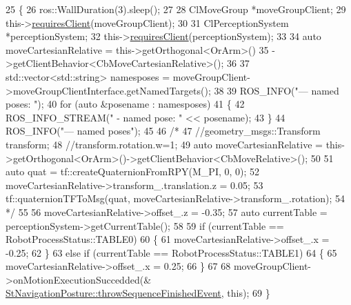 \begin{DoxyCode}
25     \{
26         ros::WallDuration(3).sleep();
27 
28         ClMoveGroup *moveGroupClient;
29         this->\hyperlink{classsmacc_1_1ISmaccState_a7f95c9f0a6ea2d6f18d1aec0519de4ac}{requiresClient}(moveGroupClient);
30 
31         ClPerceptionSystem *perceptionSystem;
32         this->\hyperlink{classsmacc_1_1ISmaccState_a7f95c9f0a6ea2d6f18d1aec0519de4ac}{requiresClient}(perceptionSystem);
33 
34         \textcolor{keyword}{auto} moveCartesianRelative = this->getOrthogonal<OrArm>()
35                                          ->getClientBehavior<CbMoveCartesianRelative>();
36 
37         std::vector<std::string> namesposes = moveGroupClient->moveGroupClientInterface.getNamedTargets();
38 
39         ROS\_INFO(\textcolor{stringliteral}{"--- named poses: "});
40         \textcolor{keywordflow}{for} (\textcolor{keyword}{auto} &posename : namesposes)
41         \{
42             ROS\_INFO\_STREAM(\textcolor{stringliteral}{" - named pose: "} << posename);
43         \}
44         ROS\_INFO(\textcolor{stringliteral}{"--- named poses"});
45 
46         \textcolor{comment}{/*}
47 \textcolor{comment}{        //geometry\_msgs::Transform transform;}
48 \textcolor{comment}{        //transform.rotation.w=1;}
49 \textcolor{comment}{        auto moveCartesianRelative = this->getOrthogonal<OrArm>()->getClientBehavior<CbMoveRelative>();}
50 \textcolor{comment}{}
51 \textcolor{comment}{        auto quat = tf::createQuaternionFromRPY(M\_PI, 0, 0);}
52 \textcolor{comment}{        moveCartesianRelative->transform\_.translation.z = 0.05;}
53 \textcolor{comment}{        tf::quaternionTFToMsg(quat, moveCartesianRelative->transform\_.rotation);}
54 \textcolor{comment}{        */}
55 
56         moveCartesianRelative->offset\_.z = -0.35;
57         \textcolor{keyword}{auto} currentTable = perceptionSystem->getCurrentTable();
58 
59         \textcolor{keywordflow}{if} (currentTable == RobotProcessStatus::TABLE0)
60         \{
61             moveCartesianRelative->offset\_.x = -0.25;
62         \}
63         \textcolor{keywordflow}{else} \textcolor{keywordflow}{if} (currentTable == RobotProcessStatus::TABLE1)
64         \{
65             moveCartesianRelative->offset\_.x = 0.25;
66         \}
67 
68         moveGroupClient->onMotionExecutionSuccedded(&
      \hyperlink{classsmacc_1_1SmaccState_a49dcfc25824f7e083dd4b999c49ab2b6}{StNavigationPosture::throwSequenceFinishedEvent}, \textcolor{keyword}{this});
69     \}
\end{DoxyCode}


